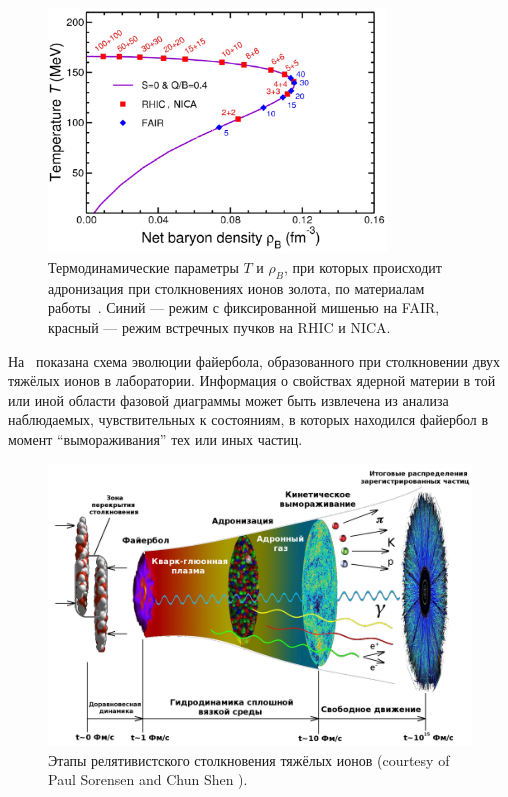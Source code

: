 \begin{figure}[H]
\includegraphics[width=0.8\textwidth]{pictures/Phase_diag.png}
\caption{Термодинамические параметры $T$ и $\rho_{B}$, при которых происходит адронизация при столкновениях ионов золота, по материалам работы~\cite{Randrup}. Синий --- режим с фиксированной мишенью на FAIR, красный --- режим встречных пучков на RHIC и NICA.}
\label{fig:PhaseDiagram2}
\end{figure}

На~ показана схема эволюции файербола, образованного при столкновении двух тяжёлых ионов в лаборатории.
Информация о свойствах ядерной материи в той или иной области фазовой диаграммы может быть извлечена из анализа наблюдаемых, чувствительных к состояниям, в которых находился файербол в момент ``вымораживания'' тех или иных частиц.

\begin{figure}[H]
\includegraphics[width=1.0\textwidth]{pictures/little_bang_rus2.png}
\caption{Этапы релятивистского столкновения тяжёлых ионов (courtesy of Paul Sorensen and Chun Shen \todo).}
\label{fig:LittleBang}
\end{figure}

